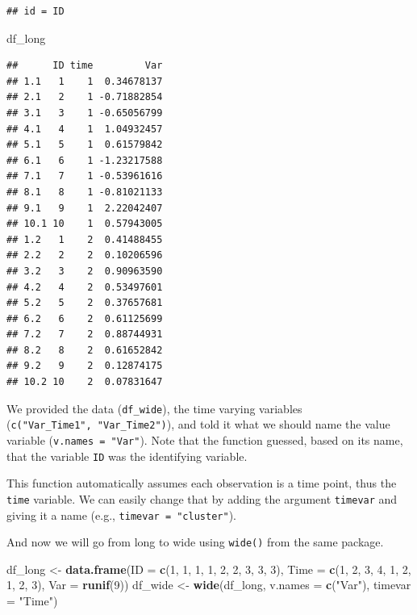 \documentclass[]{tufte-book}
\newenvironment{Shaded}{}{}
\newcommand{\KeywordTok}[1]{\textcolor[rgb]{0.00,0.44,0.13}{\textbf{#1}}}
\newcommand{\DataTypeTok}[1]{\textcolor[rgb]{0.56,0.13,0.00}{#1}}
\newcommand{\DecValTok}[1]{\textcolor[rgb]{0.25,0.63,0.44}{#1}}
\newcommand{\StringTok}[1]{\textcolor[rgb]{0.25,0.44,0.63}{#1}}
\newcommand{\NormalTok}[1]{#1}
\theoremstyle{definition}
\theoremstyle{definition}
\theoremstyle{remark}
\begin{document}
\begin{verbatim}
## id = ID
\end{verbatim}

\begin{Shaded}
\begin{Highlighting}[]
\NormalTok{df_long}
\end{Highlighting}
\end{Shaded}

\begin{verbatim}
##      ID time         Var
## 1.1   1    1  0.34678137
## 2.1   2    1 -0.71882854
## 3.1   3    1 -0.65056799
## 4.1   4    1  1.04932457
## 5.1   5    1  0.61579842
## 6.1   6    1 -1.23217588
## 7.1   7    1 -0.53961616
## 8.1   8    1 -0.81021133
## 9.1   9    1  2.22042407
## 10.1 10    1  0.57943005
## 1.2   1    2  0.41488455
## 2.2   2    2  0.10206596
## 3.2   3    2  0.90963590
## 4.2   4    2  0.53497601
## 5.2   5    2  0.37657681
## 6.2   6    2  0.61125699
## 7.2   7    2  0.88744931
## 8.2   8    2  0.61652842
## 9.2   9    2  0.12874175
## 10.2 10    2  0.07831647
\end{verbatim}

We provided the data (\texttt{df\_wide}), the time varying variables
(\texttt{c("Var\_Time1",\ "Var\_Time2")}), and told it what we should
name the value variable (\texttt{v.names\ =\ "Var"}). Note that the
function guessed, based on its name, that the variable \texttt{ID} was
the identifying variable.

This function automatically assumes each observation is a time point,
thus the \texttt{time} variable. We can easily change that by adding the
argument \texttt{timevar} and giving it a name (e.g.,
\texttt{timevar\ =\ "cluster"}).

And now we will go from long to wide using \texttt{wide()} from the same
package.

\begin{Shaded}
\begin{Highlighting}[]
\NormalTok{df_long <-}\StringTok{ }\KeywordTok{data.frame}\NormalTok{(}\DataTypeTok{ID =} \KeywordTok{c}\NormalTok{(}\DecValTok{1}\NormalTok{, }\DecValTok{1}\NormalTok{, }\DecValTok{1}\NormalTok{, }\DecValTok{1}\NormalTok{, }\DecValTok{2}\NormalTok{, }\DecValTok{2}\NormalTok{, }
    \DecValTok{3}\NormalTok{, }\DecValTok{3}\NormalTok{, }\DecValTok{3}\NormalTok{), }\DataTypeTok{Time =} \KeywordTok{c}\NormalTok{(}\DecValTok{1}\NormalTok{, }\DecValTok{2}\NormalTok{, }\DecValTok{3}\NormalTok{, }\DecValTok{4}\NormalTok{, }\DecValTok{1}\NormalTok{, }\DecValTok{2}\NormalTok{, }\DecValTok{1}\NormalTok{, }\DecValTok{2}\NormalTok{, }
    \DecValTok{3}\NormalTok{), }\DataTypeTok{Var =} \KeywordTok{runif}\NormalTok{(}\DecValTok{9}\NormalTok{))}
\NormalTok{df_wide <-}\StringTok{ }\KeywordTok{wide}\NormalTok{(df_long, }\DataTypeTok{v.names =} \KeywordTok{c}\NormalTok{(}\StringTok{"Var"}\NormalTok{), }\DataTypeTok{timevar =} \StringTok{"Time"}\NormalTok{)}
\end{Highlighting}
\end{Shaded}
\end{document}
